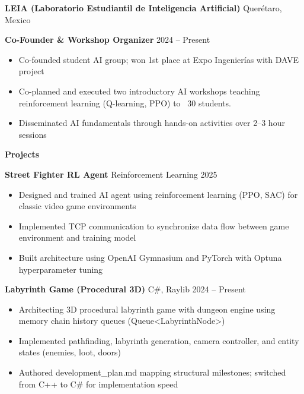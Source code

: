 \documentclass[11pt]{article}
\begin{document}
\vspace{12pt}

\textbf{LEIA (Laboratorio Estudiantil de Inteligencia Artificial)} \hfill Querétaro, Mexico

\textbf{Co-Founder \& Workshop Organizer} \hfill 2024 – Present
\begin{itemize}[noitemsep, topsep=0pt, partopsep=0pt, parsep=0pt]
    \item Co-founded student AI group; won 1st place at Expo Ingenierías with DAVE project
    \item Co-planned and executed two introductory AI workshops teaching reinforcement learning (Q-learning, PPO) to ~30 students.
    \item Disseminated AI fundamentals through hands-on activities over 2–3 hour sessions
\end{itemize}

\vspace{12pt}

\begin{center}
    \textbf{Projects}
\end{center}
\textbf{Street Fighter RL Agent} \hfill Reinforcement Learning \hfill 2025
\begin{itemize}[noitemsep, topsep=0pt, partopsep=0pt, parsep=0pt]
    \item Designed and trained AI agent using reinforcement learning (PPO, SAC) for classic video game environments
    \item Implemented TCP communication to synchronize data flow between game environment and training model
    \item Built architecture using OpenAI Gymnasium and PyTorch with Optuna hyperparameter tuning
\end{itemize}

\vspace{6pt}

\textbf{Labyrinth Game (Procedural 3D)} \hfill C\#, Raylib \hfill 2024 – Present
\begin{itemize}[noitemsep, topsep=0pt, partopsep=0pt, parsep=0pt]
    \item Architecting 3D procedural labyrinth game with dungeon engine using memory chain history queues (Queue<LabyrinthNode>)
    \item Implemented pathfinding, labyrinth generation, camera controller, and entity states (enemies, loot, doors)
    \item Authored development\_plan.md mapping structural milestones; switched from C++ to C\# for implementation speed
\end{itemize}
\end{document}
